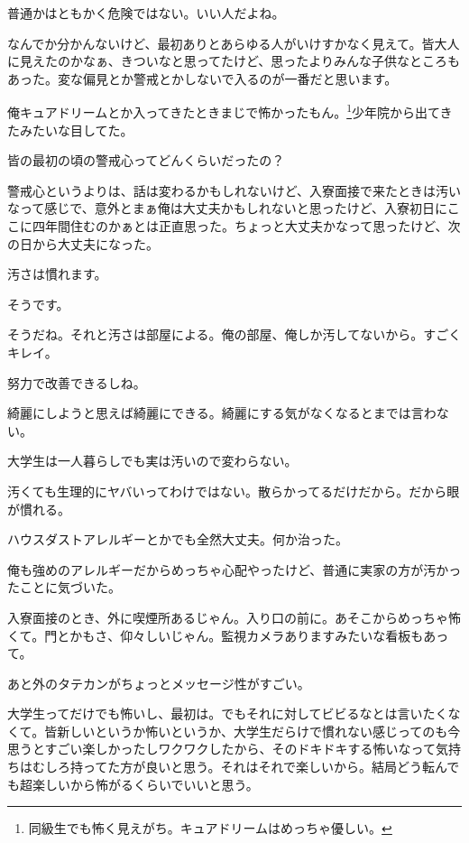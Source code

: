 \begin{multicols}{2}
普通かはともかく危険ではない。いい人だよね。

なんでか分かんないけど、最初ありとあらゆる人がいけすかなく見えて。皆大人に見えたのかなぁ、きついなと思ってたけど、思ったよりみんな子供なところもあった。変な偏見とか警戒とかしないで入るのが一番だと思います。

俺キュアドリームとか入ってきたときまじで怖かったもん。\footnote{同級生でも怖く見えがち。キュアドリームはめっちゃ優しい。}少年院から出てきたみたいな目してた。

皆の最初の頃の警戒心ってどんくらいだったの？

警戒心というよりは、話は変わるかもしれないけど、入寮面接で来たときは汚いなって感じで、意外とまぁ俺は大丈夫かもしれないと思ったけど、入寮初日にここに四年間住むのかぁとは正直思った。ちょっと大丈夫かなって思ったけど、次の日から大丈夫になった。

汚さは慣れます。

そうです。

そうだね。それと汚さは部屋による。俺の部屋、俺しか汚してないから。すごくキレイ。

努力で改善できるしね。

綺麗にしようと思えば綺麗にできる。綺麗にする気がなくなるとまでは言わない。

大学生は一人暮らしでも実は汚いので変わらない。

汚くても生理的にヤバいってわけではない。散らかってるだけだから。だから眼が慣れる。

ハウスダストアレルギーとかでも全然大丈夫。何か治った。

俺も強めのアレルギーだからめっちゃ心配やったけど、普通に実家の方が汚かったことに気づいた。

入寮面接のとき、外に喫煙所あるじゃん。入り口の前に。あそこからめっちゃ怖くて。門とかもさ、仰々しいじゃん。監視カメラありますみたいな看板もあって。

あと外のタテカンがちょっとメッセージ性がすごい。

大学生ってだけでも怖いし、最初は。でもそれに対してビビるなとは言いたくなくて。皆新しいというか怖いというか、大学生だらけで慣れない感じってのも今思うとすごい楽しかったしワクワクしたから、そのドキドキする怖いなって気持ちはむしろ持ってた方が良いと思う。それはそれで楽しいから。結局どう転んでも超楽しいから怖がるくらいでいいと思う。


\end{multicols}
